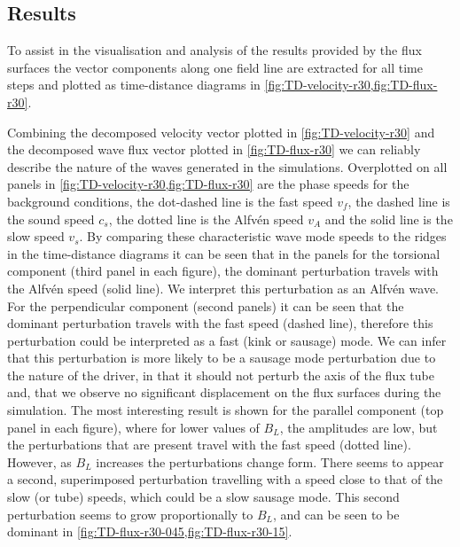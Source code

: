 \subsection{Results}\label{subsec:results}

To assist in the visualisation and analysis of the results provided by the flux surfaces the vector components along one field line are extracted for all time steps and plotted as time-distance diagrams in \cref{fig:TD-velocity-r30,fig:TD-flux-r30}.

Combining the decomposed velocity vector plotted in \cref{fig:TD-velocity-r30} and the decomposed wave flux vector plotted in \cref{fig:TD-flux-r30} we can reliably describe the nature of the waves generated in the simulations.
Overplotted on all panels in \cref{fig:TD-velocity-r30,fig:TD-flux-r30} are the phase speeds for the background conditions, the dot-dashed line is the fast speed $v_f$, the dashed line is the sound speed $c_s$, the dotted line is the Alfv\'en speed $v_A$ and the solid line is the slow speed $v_s$.
By comparing these characteristic wave mode speeds to the ridges in the time-distance diagrams it can be seen that in the panels for the torsional component (third panel in each figure), the dominant perturbation travels with the Alfv\'en speed (solid line).
We interpret this perturbation as an Alfv\'en wave.
For the perpendicular component (second panels) it can be seen that the dominant perturbation travels with the fast speed (dashed line), therefore this perturbation could be interpreted as a fast (kink or sausage) mode.
We can infer that this perturbation is more likely to be a sausage mode perturbation due to the nature of the driver, in that it should not perturb the axis of the flux tube and, that we observe no significant displacement on the flux surfaces during the simulation.
The most interesting result is shown for the parallel component (top panel in each figure), where for lower values of $B_L$, the amplitudes are low, but the perturbations that are present travel with the fast speed (dotted line).
However, as $B_L$ increases the perturbations change form.
There seems to appear a second, superimposed perturbation travelling with a speed close to that of the slow (or tube) speeds, which could be a slow sausage mode.
This second perturbation seems to grow proportionally to $B_L$, and can be seen to be dominant in \cref{fig:TD-flux-r30-045,fig:TD-flux-r30-15}.

